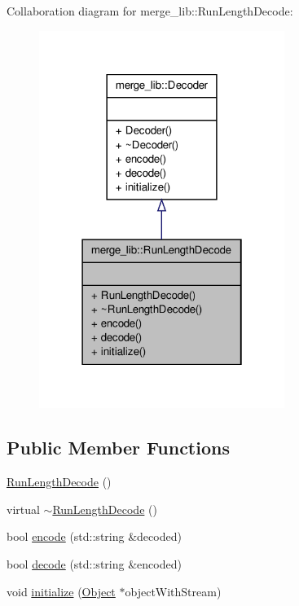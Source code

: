 Collaboration diagram for merge\-\_\-lib\-:\-:Run\-Length\-Decode\-:
\nopagebreak
\begin{figure}[H]
\begin{center}
\leavevmode
\includegraphics[width=226pt]{d7/d3b/classmerge__lib_1_1_run_length_decode__coll__graph}
\end{center}
\end{figure}
\subsection*{Public Member Functions}
\begin{DoxyCompactItemize}
\item 
\hyperlink{classmerge__lib_1_1_run_length_decode_adf5c69f9f7d811630f167f455ad96291}{Run\-Length\-Decode} ()
\item 
virtual \hyperlink{classmerge__lib_1_1_run_length_decode_acd3cf08f643c792a439ed980afbc05fd}{$\sim$\-Run\-Length\-Decode} ()
\item 
bool \hyperlink{classmerge__lib_1_1_run_length_decode_aa4e39b5fb095af62d99bceb32dfb74cd}{encode} (std\-::string \&decoded)
\item 
bool \hyperlink{classmerge__lib_1_1_run_length_decode_ad520312d2a6150389403fccbc3592a37}{decode} (std\-::string \&encoded)
\item 
void \hyperlink{classmerge__lib_1_1_run_length_decode_a10bc1d6bd6bfed926f5009416dd3b94b}{initialize} (\hyperlink{classmerge__lib_1_1_object}{Object} $\ast$object\-With\-Stream)
\end{DoxyCompactItemize}


